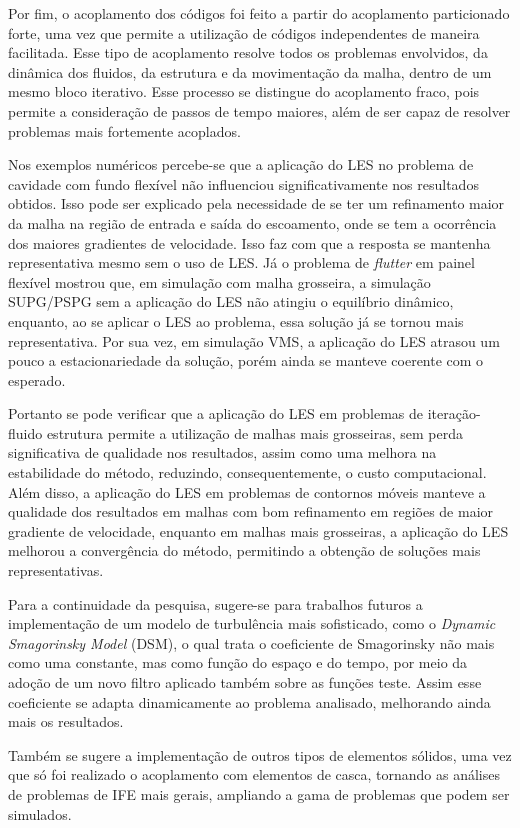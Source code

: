 Por fim, o acoplamento dos códigos foi feito a partir do acoplamento particionado forte, uma vez que permite a utilização de códigos independentes de maneira facilitada. Esse tipo de acoplamento resolve todos os problemas envolvidos, da dinâmica dos fluidos, da estrutura e da movimentação da malha, dentro de um mesmo bloco iterativo. Esse processo se distingue do acoplamento fraco, pois permite a consideração de passos de tempo maiores, além de ser capaz de resolver problemas mais fortemente acoplados.

Nos exemplos numéricos percebe-se que a aplicação do LES no problema de cavidade com fundo flexível não influenciou significativamente nos resultados obtidos. Isso pode ser explicado pela necessidade de se ter um refinamento maior da malha na região de entrada e saída do escoamento, onde se tem a ocorrência dos maiores gradientes de velocidade. Isso faz com que a resposta se mantenha representativa mesmo sem o uso de LES. Já o problema de \textit{flutter} em painel flexível mostrou que, em simulação com malha grosseira, a simulação SUPG/PSPG sem a aplicação do LES não atingiu o equilíbrio dinâmico, enquanto, ao se aplicar o LES ao problema, essa solução já se tornou mais representativa. Por sua vez, em simulação VMS, a aplicação do LES atrasou um pouco a estacionariedade da solução, porém ainda se manteve coerente com o esperado.

Portanto se pode verificar que a aplicação do LES em problemas de iteração-fluido estrutura permite a utilização de malhas mais grosseiras, sem perda significativa de qualidade nos resultados, assim como uma melhora na estabilidade do método, reduzindo, consequentemente, o custo computacional. Além disso, a aplicação do LES em problemas de contornos móveis manteve a qualidade dos resultados em malhas com bom refinamento em regiões de maior gradiente de velocidade, enquanto em malhas mais grosseiras, a aplicação do LES melhorou a convergência do método, permitindo a obtenção de soluções mais representativas.


Para a continuidade da pesquisa, sugere-se para trabalhos futuros a implementação de um modelo de turbulência mais sofisticado, como o \textit{Dynamic Smagorinsky Model} (DSM), o qual trata o coeficiente de Smagorinsky não mais como uma constante, mas como função do espaço e do tempo, por meio da adoção de um novo filtro aplicado também sobre as funções teste. Assim esse coeficiente se adapta dinamicamente ao problema analisado, melhorando ainda mais os resultados.

Também se sugere a implementação de outros tipos de elementos sólidos, uma vez que só foi realizado o acoplamento com elementos de casca, tornando as análises de problemas de IFE mais gerais, ampliando a gama de problemas que podem ser simulados.
